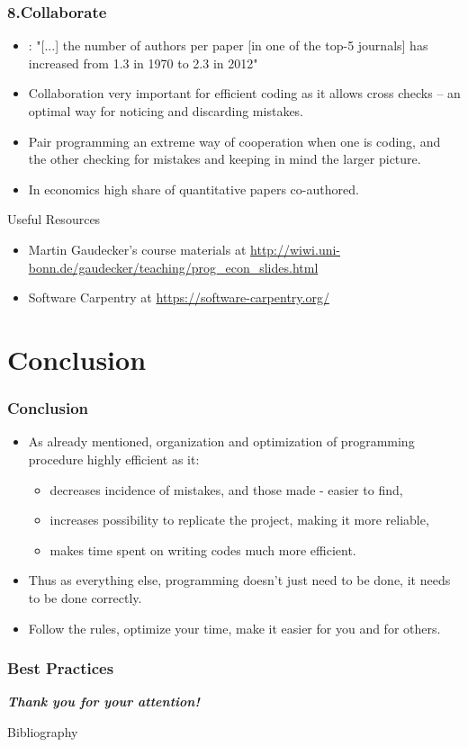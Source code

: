 \documentclass{beamer}
\begin{document}
\begin{frame}
\frametitle{8.Collaborate}
\begin{itemize}
\item \citet{CardDellaVigna2013}: "[...] the number of authors per paper [in one of the top-5 journals] has increased from 1.3 in 1970 to 2.3 in 2012"
\item Collaboration very important for efficient coding as it allows cross checks -- an optimal way for noticing and discarding mistakes.
\item Pair programming an extreme way of cooperation when one is coding, and the other checking for mistakes and keeping in mind the larger picture.
\item In economics high share of quantitative papers co-authored.
\end{itemize}
\end{frame}

\begin{frame}{Useful Resources}
  \begin{itemize}
    \item Martin Gaudecker's course materials at \url{http://wiwi.uni-bonn.de/gaudecker/teaching/prog_econ_slides.html}
    \item Software Carpentry at \url{https://software-carpentry.org/}
  \end{itemize}
\end{frame}
\section{Conclusion}
\begin{frame}
\frametitle{Conclusion}
\begin{itemize}
\item As already mentioned, organization and optimization of programming procedure highly efficient as it:
\begin{itemize}
\item decreases incidence of mistakes, and those made - easier to find,
\item increases possibility to replicate the project, making it more reliable,
\item makes time spent on writing codes much more efficient.
\end{itemize}
\item Thus as everything else, programming doesn't just need to be done, it needs to be done correctly.
\item Follow the rules, optimize your time, make it easier for you and for others.
\end{itemize}
\end{frame}
\begin{frame}
\frametitle{\textcolor[rgb]{0.2,0.2,0.7}{Best Practices}}
\textbf{\emph{Thank you for your attention!}}
\end{frame}

\begin{frame}[allowframebreaks]{Bibliography}
\printbibliography
\end{frame}
\end{document}
